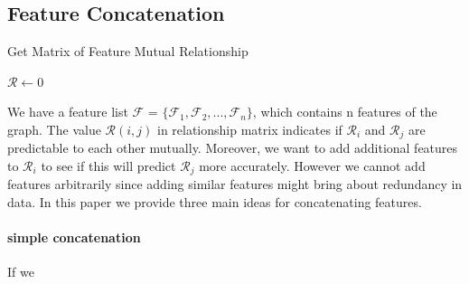 \documentclass[sigconf]{acmart}
\begin{document}
\subsection{Feature Concatenation}
\begin{algorithm}
  \caption{Get Matrix of Feature Mutual Relationship}
  $\mathcal R \gets 0$\\
  \end{algorithm}
  We have a feature list $\mathcal F$ = $\{ \mathcal F_{1}, \mathcal F_{2},..., \mathcal F_{n}\}$, which contains n 
  features of the graph. The value $\mathcal R(i,j)$ in relationship matrix indicates if $ \mathcal R_{i}$ and
  $\mathcal R_{j}$ are predictable to each other mutually. Moreover, we want to add additional features to $\mathcal R_{i}$
  to see if this will predict $\mathcal R_{j}$ more accurately. However we cannot add features arbitrarily since adding similar features might 
  bring about redundancy in data. In this paper we provide three main ideas for concatenating features.
  
\paragraph{simple concatenation}
If we 
\end{document}
